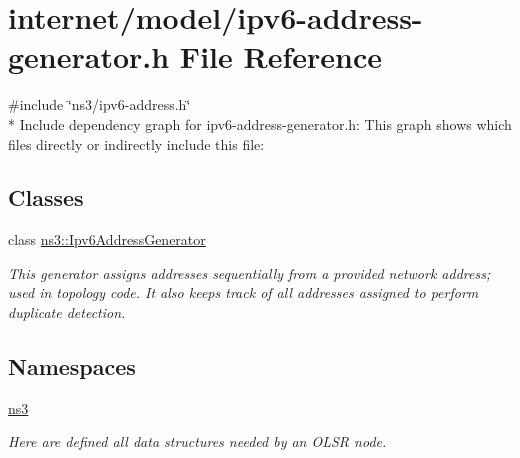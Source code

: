 \hypertarget{ipv6-address-generator_8h}{}\section{internet/model/ipv6-\/address-\/generator.h File Reference}
\label{ipv6-address-generator_8h}
{\ttfamily \#include \char`\"{}ns3/ipv6-\/address.\+h\char`\"{}}\\*
Include dependency graph for ipv6-\/address-\/generator.h\+:
This graph shows which files directly or indirectly include this file\+:
\subsection*{Classes}
\begin{DoxyCompactItemize}
\item 
class \hyperlink{classns3_1_1Ipv6AddressGenerator}{ns3\+::\+Ipv6\+Address\+Generator}
\begin{DoxyCompactList}\small\item\em This generator assigns addresses sequentially from a provided network address; used in topology code. It also keeps track of all addresses assigned to perform duplicate detection. \end{DoxyCompactList}\end{DoxyCompactItemize}
\subsection*{Namespaces}
\begin{DoxyCompactItemize}
\item 
 \hyperlink{namespacens3}{ns3}
\begin{DoxyCompactList}\small\item\em Here are defined all data structures needed by an O\+L\+SR node. \end{DoxyCompactList}\end{DoxyCompactItemize}
